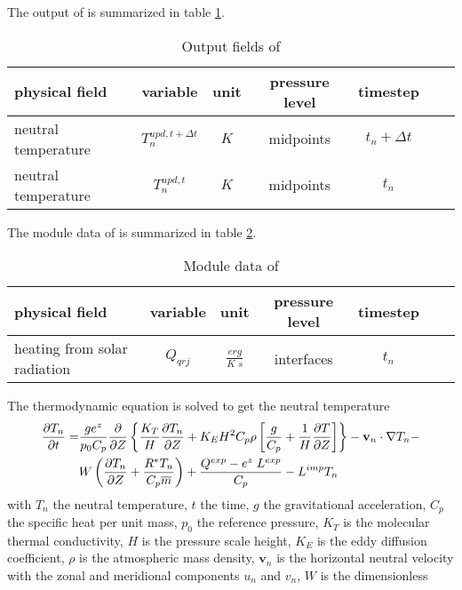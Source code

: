 %
The output of  is summarized in table
\ref{tab:output_dt}.
%
\begin{table}[tb]
\begin{tabular}{|p{3.5cm} ||c|c|c|c|c|c|} \hline
physical field               & variable        & unit&pressure
level& timestep \\ \hline \hline
neutral temperature    &       {$T_n^{upd,t+\Delta t}$}     & $K$   & midpoints  & $t_n+\Delta t$ \\
neutral temperature     &       {$T_n^{upd,t}$}     & $K$   &
midpoints & $t_n$
\\ \hline \hline
\end{tabular}
\caption{Output fields of } \label{tab:output_dt}
\end{table}
%
%
The module data of  is summarized in table
\ref{tab:module_dt}.
%
\begin{table}[tb]
\begin{tabular}{|p{3.5cm} ||c|c|c|c|c|c|} \hline
physical field               & variable        & unit&pressure
level& timestep \\ \hline \hline heating from solar radiation    &
{$Q_{qrj}$}     & $\frac{erg}{K \; s}$   & interfaces  & $t_n$
\\ \hline \hline
\end{tabular}
\caption{Module data of } \label{tab:module_dt}
\end{table}
%
The thermodynamic equation is solved to get the neutral temperature
%
\begin{align}
  \frac{\partial T_n}{\partial t} = & \frac{g e^z}{p_0 C_p}\frac{\partial}{\partial Z}
  \left\{ \frac{K_T}{H} \frac{\partial T_n}{\partial Z} + K_E H^2 C_p \rho \left[
   \frac{g}{C_p} + \frac{1}{H}\frac{\partial T}{\partial
   Z}\right]\right\} - \mathbf{v}_n\cdot \nabla T_n - \notag  \\
   {}&  W \left(
   \frac{\partial T_n}{\partial Z} + \frac{R^* T_n}{C_p \overline{m}}
   \right) + \frac{Q^{exp}-e^z \; L^{exp}}{C_p} - L^{imp}  T_n\label{eq:dt_1}
\end{align}
%
with $T_n$ the neutral temperature, $t$ the time, $g$ the
gravitational acceleration, $C_p$ the specific heat per unit mass,
$p_0 $ the reference pressure, $K_T$ is the molecular thermal
conductivity, $H$ is the pressure scale height, $K_E$ is the eddy
diffusion coefficient, $\rho$ is the atmospheric mass density,
$\mathbf{v}_n$ is the horizontal neutral velocity with the zonal and
meridional components $u_n$ and $v_n$, $W$ is the dimensionless
